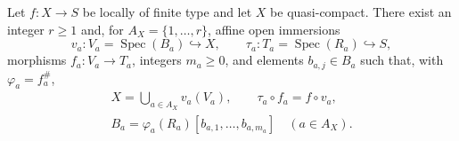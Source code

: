 \begin{lemma}
  \label{lemma:nagata-finite-affine-presentation-locally-finite-type}
  \lean{}

  Let $f\colon X\to S$ be locally of finite type and let $X$ be
  quasi-compact.  There exist an integer $r\geq1$ and, for
  $A_X=\{1,\ldots,r\}$, affine open immersions
  \[
    v_a\colon V_a=\operatorname{Spec}(B_a)\hookrightarrow X,
    \qquad
    \tau_a\colon T_a=\operatorname{Spec}(R_a)\hookrightarrow S,
  \]
  morphisms $f_a\colon V_a\to T_a$, integers $m_a\geq0$, and elements
  $b_{a,j}\in B_a$ such that, with $\varphi_a=f_a^\#$,
  \[
  \begin{gathered}
    X=\bigcup_{a\in A_X}v_a(V_a),\qquad
    \tau_a\circ f_a=f\circ v_a,\\
    B_a=\varphi_a(R_a)[b_{a,1},\ldots,b_{a,m_a}]
      \quad(a\in A_X).
  \end{gathered}
  \]
\end{lemma}

